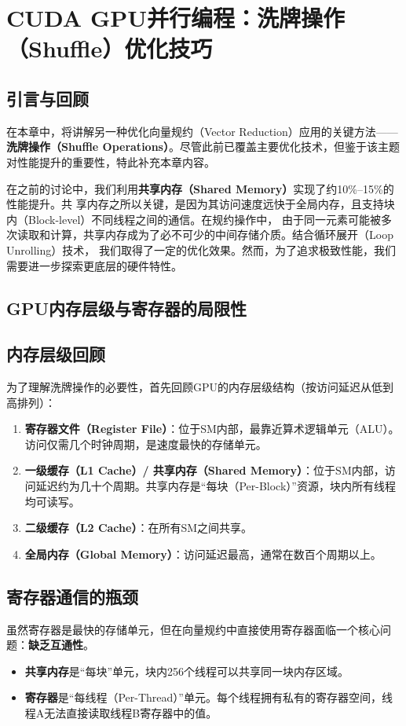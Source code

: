 \section{CUDA GPU并行编程：洗牌操作（Shuffle）优化技巧}

\subsection{引言与回顾}

在本章中，将讲解另一种优化向量规约（Vector Reduction）应用的关键方法——\textbf
{洗牌操作（Shuffle Operations）}。尽管此前已覆盖主要优化技术，但鉴于该主题对性能提升的重要性，特此补充本章内容。

在之前的讨论中，我们利用\textbf{共享内存（Shared Memory）}实现了约10\%--15\%的性能提升。共
享内存之所以关键，是因为其访问速度远快于全局内存，且支持块内（Block-level）不同线程之间的通信。在规约操作中，
由于同一元素可能被多次读取和计算，共享内存成为了必不可少的中间存储介质。结合循环展开（Loop Unrolling）技术，
我们取得了一定的优化效果。然而，为了追求极致性能，我们需要进一步探索更底层的硬件特性。

\subsection{GPU内存层级与寄存器的局限性}

\subsection{内存层级回顾}
为了理解洗牌操作的必要性，首先回顾GPU的内存层级结构（按访问延迟从低到高排列）：
\begin{enumerate}
    \item \textbf{寄存器文件（Register File）}：位于SM内部，最靠近算术逻辑单元（ALU）。访问仅需几个时钟周期，是速度最快的存储单元。
    \item \textbf{一级缓存（L1 Cache）/ 共享内存（Shared Memory）}：位于SM内部，访问延迟约为几十个周期。共享内存是“每块（Per-Block）”资源，块内所有线程均可读写。
    \item \textbf{二级缓存（L2 Cache）}：在所有SM之间共享。
    \item \textbf{全局内存（Global Memory）}：访问延迟最高，通常在数百个周期以上。
\end{enumerate}

\subsection{寄存器通信的瓶颈}
虽然寄存器是最快的存储单元，但在向量规约中直接使用寄存器面临一个核心问题：\textbf{缺乏互通性}。
\begin{itemize}
    \item \textbf{共享内存}是“每块”单元，块内256个线程可以共享同一块内存区域。
    \item \textbf{寄存器}是“每线程（Per-Thread）”单元。每个线程拥有私有的寄存器空间，线程A无法直接读取线程B寄存器中的值。
\end{itemize}

